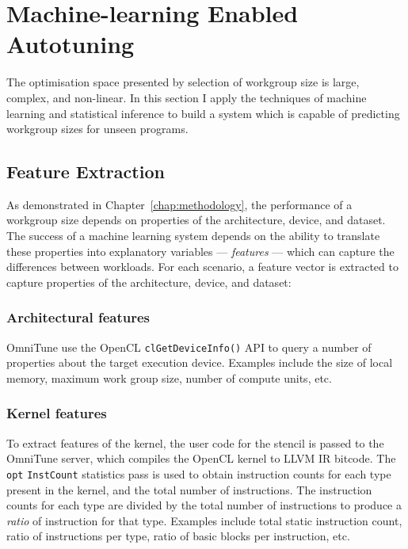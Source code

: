 


\section{Machine-learning Enabled Autotuning}

The optimisation space presented by selection of workgroup size is
large, complex, and non-linear. In this section I apply the techniques
of machine learning and statistical inference to build a system which
is capable of predicting workgroup sizes for unseen programs.


\subsection{Feature Extraction}

As demonstrated in Chapter~\ref{chap:methodology}, the performance of
a workgroup size depends on properties of the architecture, device,
and dataset. The success of a machine learning system depends on the
ability to translate these properties into explanatory variables ---
\emph{features} --- which can capture the differences between
workloads. For each scenario, a feature vector is extracted to capture
properties of the architecture, device, and dataset:


\subsubsection{Architectural features}

OmniTune use the OpenCL \texttt{clGetDeviceInfo()} API to query a
number of properties about the target execution device. Examples
include the size of local memory, maximum work group size, number of
compute units, etc.


\subsubsection{Kernel features}

To extract features of the kernel, the user code for the stencil is
passed to the OmniTune server, which compiles the OpenCL kernel to
LLVM IR bitcode. The \texttt{opt} \texttt{InstCount} statistics pass
is used to obtain instruction counts for each type present in the
kernel, and the total number of instructions. The instruction counts
for each type are divided by the total number of instructions to
produce a \emph{ratio} of instruction for that type. Examples include
total static instruction count, ratio of instructions per type, ratio
of basic blocks per instruction, etc.

